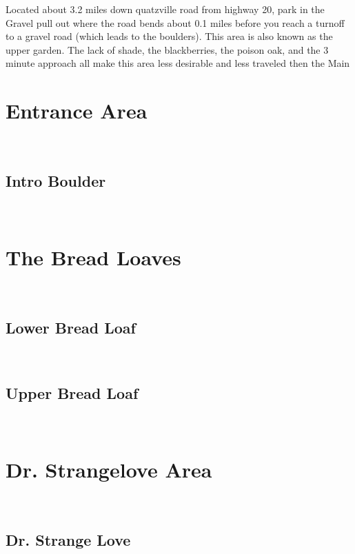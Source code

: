 \begin{multicols*}{2}
\begin{minipage}{\columnwidth}
Located about 3.2 miles down quatzville road from highway 20, park in the Gravel pull out where the road bends about 0.1 miles before you reach a turnoff to a gravel road (which leads to the boulders). This area is also known as the upper garden. The lack of shade, the blackberries, the poison oak, and the 3 minute approach all make this area less desirable and less traveled then the Main
\end{minipage}

		\section{Entrance Area}\label{sa:Entrance Area}
	\begin{minipage}{\columnwidth}
	\
	\end{minipage}
			\subsection*{Intro Boulder}\label{bf:Intro Boulder}
			\begin{minipage}{\columnwidth}
			\
			\end{minipage}
			
		\section{The Bread Loaves}\label{sa:The Bread Loaves}
	\begin{minipage}{\columnwidth}
	\
	\end{minipage}
			\subsection*{Lower Bread Loaf}\label{bf:Lower Bread Loaf}
			\begin{minipage}{\columnwidth}
			\
			\end{minipage}
			
			\subsection*{Upper Bread Loaf}\label{bf:Upper Bread Loaf}
			\begin{minipage}{\columnwidth}
			\
			\end{minipage}
			
		\section{Dr. Strangelove Area}\label{sa:Dr. Strangelove Area}
	\begin{minipage}{\columnwidth}
	\
	\end{minipage}
			\subsection*{Dr. Strange Love}\label{bf:Dr. Strange Love}
			\begin{minipage}{\columnwidth}
			\
			\end{minipage}
			
\end{multicols*}
\clearpage